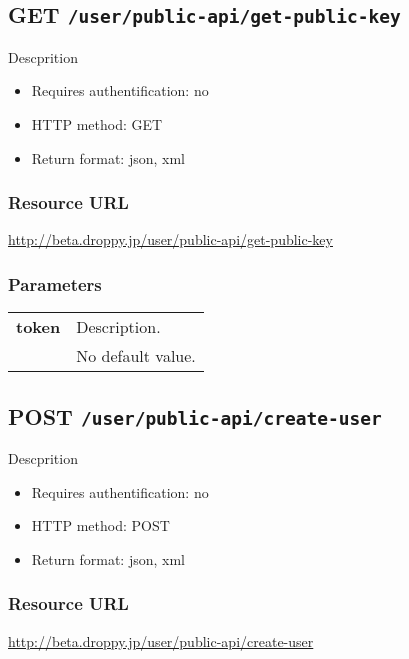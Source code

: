 \documentclass[11pt,a4paper]{article}
\newcommand{\content}[1]{\begin{minipage}{10cm}\vspace{2mm}#1\vspace{2mm}\end{minipage}}
\begin{document}
      
  \subsection*{GET {\tt /user/public-api/get-public-key}}
  Descprition
  \begin{itemize}
  \item Requires authentification: no
  \item HTTP method: GET
  \item Return format: json, xml
  \end{itemize}
  \subsubsection*{Resource URL}
  \url{http://beta.droppy.jp/user/public-api/get-public-key}
  \subsubsection*{Parameters}
  \begin{table}[h]
    \begin{center}
      \begin{tabular}{l l}
        \hline 
      \textbf{token} & \content{Description. }
      \\
       & No default value.\\
      \hline
      \end{tabular}
    \end{center}
  \end{table}
  
      \newpage
      
      
  \subsection*{POST {\tt /user/public-api/create-user}}
  Descprition
  \begin{itemize}
  \item Requires authentification: no
  \item HTTP method: POST
  \item Return format: json, xml
  \end{itemize}
  \subsubsection*{Resource URL}
  \url{http://beta.droppy.jp/user/public-api/create-user}
\end{document}
